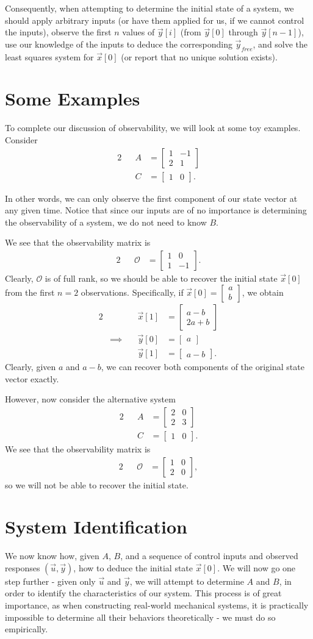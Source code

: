 \documentclass[letterpaper]{article}
\theoremstyle{remark}
\newcommand{\mat}[1]{\ensuremath{\begin{bmatrix}#1\end{bmatrix}}}
\newcommand{\eqn}[1]{\begin{alignat*}{2}#1\end{alignat*}}
\newcommand*{\thus}{&\implies\quad&}
\begin{document}
Consequently, when attempting to determine the initial state of a system, we should apply arbitrary inputs (or have them applied for us, if we cannot control the inputs), observe the first $n$ values of $\vec{y}[i]$ (from $\vec{y}[0]$ through $\vec{y}[n - 1]$), use our knowledge of the inputs to deduce the corresponding $\vec{y}_{free}$, and solve the least squares system for $\vec{x}[0]$ (or report that no unique solution exists).

\section{Some Examples}
To complete our discussion of observability, we will look at some toy examples. Consider
\eqn{
    && A &= \mat{1 & -1 \\ 2 & 1} \\
    && C &= \mat{1 & 0}.
}

In other words, we can only observe the first component of our state vector at any given time. Notice that since our inputs are of no importance is determining the observability of a system, we do not need to know $B$.

We see that the observability matrix is
\eqn{
    && \mathscr{O} &= \mat{1 & 0 \\ 1 & -1}.
}
Clearly, $\mathscr{O}$ is of full rank, so we should be able to recover the initial state $\vec{x}[0]$ from the first $n = 2$ observations. Specifically, if $\vec{x}[0] = \mat{a \\ b}$, we obtain
\eqn{
    && \vec{x}[1] &= \mat{a - b \\ 2a + b} \\
    \thus \vec{y}[0] &= \mat{a} \\
    && \vec{y}[1] &= \mat{a - b}.
}
Clearly, given $a$ and $a - b$, we can recover both components of the original state vector exactly.

However, now consider the alternative system
\eqn{
    && A &= \mat{2 & 0 \\ 2 & 3} \\
    && C &= \mat{1 & 0}.
}
We see that the observability matrix is
\eqn{
    && \mathscr{O} &= \mat{1 & 0 \\ 2 & 0},
}
so we will not be able to recover the initial state.


\section{System Identification}
We now know how, given $A$, $B$, and a sequence of control inputs and observed responses $(\vec{u}, \vec{y})$, how to deduce the initial state $\vec{x}[0]$. We will now go one step further - given only $\vec{u}$ and $\vec{y}$, we will attempt to determine $A$ and $B$, in order to identify the characteristics of our system. This process is of great importance, as when constructing real-world mechanical systems, it is practically impossible to determine all their behaviors theoretically - we must do so empirically.
\end{document}
